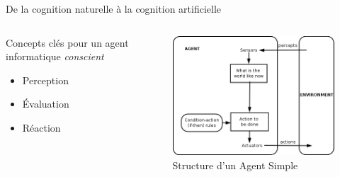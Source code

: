 \documentclass{beamer}
\begin{document}
\begin{frame}{De la cognition naturelle à la cognition artificielle}
\begin{columns}
\begin{column}{0.5\textwidth}
\begin{block}{}
Concepts clés pour un agent informatique \textit{conscient}
\begin{itemize}
    \item Perception
    \item Évaluation
    \item Réaction
\end{itemize}
\end{block}
\end{column}
\begin{column}{0.6\textwidth}
\begin{block}{}
\begin{figure}
    \centering
    \includegraphics[width=\textwidth]{IntelligentAgent-SimpleReflex.png}
    \caption{Structure d'un Agent Simple}
    \label{fig:agents}
\end{figure}
\end{block}
\end{column}
\end{columns}
\end{frame}
\end{document}
